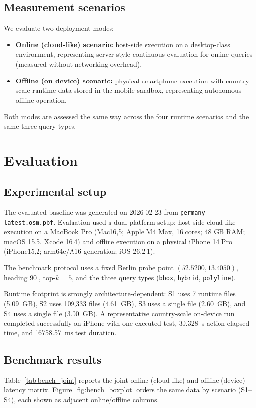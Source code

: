 \documentclass{article}
\begin{document}
\subsection{Measurement scenarios}
We evaluate two deployment modes:
\begin{itemize}
\item \textbf{Online (cloud-like) scenario:} host-side execution on a desktop-class environment, representing server-style continuous evaluation for online queries (measured without networking overhead).
\item \textbf{Offline (on-device) scenario:} physical smartphone execution with country-scale runtime data stored in the mobile sandbox, representing autonomous offline operation.
\end{itemize}

Both modes are assessed the same way across the four runtime scenarios and the same three query types.

\section{Evaluation}
\subsection{Experimental setup}
The evaluated baseline was generated on 2026-02-23 from \texttt{germany-latest.osm.pbf}. Evaluation used a dual-platform setup: host-side cloud-like execution on a MacBook Pro (Mac16,5; Apple M4 Max, 16 cores; 48 GB RAM; macOS 15.5, Xcode 16.4) and offline execution on a physical iPhone 14 Pro (iPhone15,2; arm64e/A16 generation; iOS 26.2.1).

The benchmark protocol uses a fixed Berlin probe point \((52.5200,13.4050)\), heading \(90^\circ\), top-\(k=5\), and the three query types (\texttt{bbox}, \texttt{hybrid}, \texttt{polyline}).

Runtime footprint is strongly architecture-dependent: S1 uses 7 runtime files (\SI{5.09}{GB}), S2 uses 109{,}333 files (\SI{4.61}{GB}), S3 uses a single file (\SI{2.60}{GB}), and S4 uses a single file (\SI{3.00}{GB}). A representative country-scale on-device run completed successfully on iPhone with one executed test, \SI{30.328}{s} action elapsed time, and \SI{16758.57}{ms} test duration.

\subsection{Benchmark results}
Table~\ref{tab:bench_joint} reports the joint online (cloud-like) and offline (device) latency matrix. Figure~\ref{fig:bench_boxplot} orders the same data by scenario (S1--S4), each shown as adjacent online/offline columns.
\end{document}

